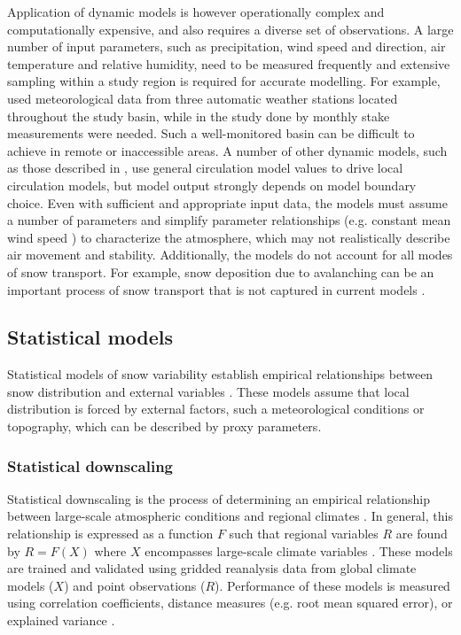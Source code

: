 \documentclass{sfuthesis}
\begin{document}
Application of dynamic models is however operationally complex and computationally expensive, and also requires a diverse set of observations. A large number of input parameters, such as precipitation, wind speed and direction, air temperature and relative humidity, need to be measured frequently and extensive sampling within a study region is required for accurate modelling\citep{Liston2006}. For example, \cite{Dadic2010} used meteorological data from three automatic weather stations located throughout the study basin, while in the study done by \cite{Mott2008} monthly stake measurements were needed. Such a well-monitored basin can be difficult to achieve in remote or inaccessible areas. A number of other dynamic models, such as those described in \cite{Fowler2007}, use general circulation model values to drive local circulation models, but model output strongly depends on model boundary choice.  Even with sufficient and appropriate input data, the models must assume a number of parameters and simplify parameter relationships (e.g. constant mean wind speed \citep{Mott2008}) to characterize the atmosphere, which may not realistically describe air movement and stability. Additionally, the models do not account for all modes of snow transport. For example, snow deposition due to avalanching can be an important process of snow transport that is not captured in current models \citep{Mott2008}. 

\subsection{Statistical models}
Statistical models of snow variability establish empirical relationships between snow distribution and external variables \citep{Fowler2007}. These models assume that local distribution is forced by external factors, such a meteorological conditions or topography, which can be described by proxy parameters.

\subsubsection{Statistical downscaling}
Statistical downscaling is the process of determining an empirical relationship between large-scale atmospheric conditions and regional climates \citep{Fowler2007}. In general, this relationship is expressed as a function $F$ such that regional variables $R$ are found by $R=F(X)$ where $X$ encompasses large-scale climate variables \citep{Fowler2007}. These models are trained and validated using gridded reanalysis data from global climate models ($X$) and point observations ($R$). Performance of these models is measured using correlation coefficients, distance measures (e.g. root mean squared error), or explained variance \citep{Fowler2007}. 
\end{document}
